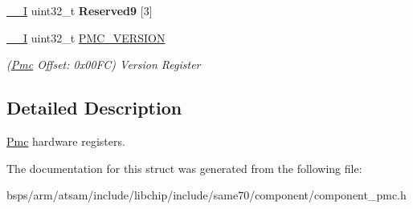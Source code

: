 \begin{DoxyCompactItemize}
\mbox{\label{structPmc_abaaf8287a1c5f9c22ed3bdc80009432a}} 
\mbox{\hyperlink{core__cm7_8h_af63697ed9952cc71e1225efe205f6cd3}{\+\_\+\+\_\+I}} uint32\+\_\+t {\bfseries Reserved9} \mbox{[}3\mbox{]}
\item 
\mbox{\label{structPmc_a3130b5ef4b0f3c64ea330b550fbe9af5}} 
\mbox{\hyperlink{core__cm7_8h_af63697ed9952cc71e1225efe205f6cd3}{\+\_\+\+\_\+I}} uint32\+\_\+t \mbox{\hyperlink{structPmc_a3130b5ef4b0f3c64ea330b550fbe9af5}{P\+M\+C\+\_\+\+V\+E\+R\+S\+I\+ON}}
\begin{DoxyCompactList}\small\item\em (\mbox{\hyperlink{structPmc}{Pmc}} Offset\+: 0x00\+FC) Version Register \end{DoxyCompactList}\end{DoxyCompactItemize}


\subsection{Detailed Description}
\mbox{\hyperlink{structPmc}{Pmc}} hardware registers. 

The documentation for this struct was generated from the following file\+:\begin{DoxyCompactItemize}
\item 
bsps/arm/atsam/include/libchip/include/same70/component/component\+\_\+pmc.\+h\end{DoxyCompactItemize}
